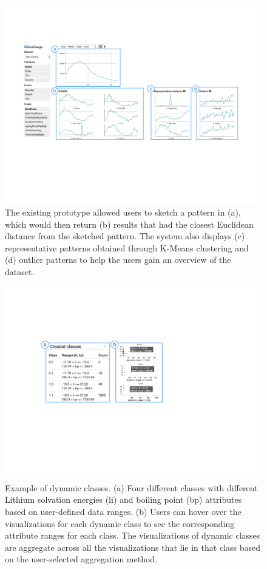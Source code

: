 \begin{figure}[h!]
	\centering
	\includegraphics[width=0.9\linewidth]{figures/oldZV_nozql.pdf}
	\caption{The existing \zv prototype allowed users to sketch a pattern in (a), which would then return (b) results that had the closest Euclidean distance from the sketched pattern. The system also displays (c) representative patterns obtained through K-Means clustering and (d) outlier patterns to help the users gain an overview of the dataset.}
	\label{oldZV}
  \vspace{-5pt}
\end{figure}
\begin{figure}[h!]
  \centering
  \includegraphics[width=0.9\linewidth]{figures/dcc.pdf}
  \caption{Example of dynamic classes. (a) Four different classes with different Lithium solvation energies (li) and boiling point (bp) attributes based on user-defined data ranges. (b) Users can hover over the visualizations for each dynamic class to see the corresponding attribute ranges for each class. The visualizations of dynamic classes are aggregate across all the visualizations that lie in that class based on the user-selected aggregation method.}
  \label{dcc}
  \vspace{-10pt}
\end{figure}
